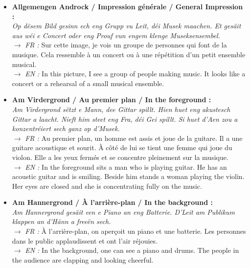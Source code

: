 \begin{itemize}
    \item \textbf{Allgemengen Androck / Impression générale / General Impression :} \\
    \textit{Op dësem Bild gesinn ech eng Grupp vu Leit, déi Musek maachen. Et gesäit aus wéi e Concert oder eng Prouf vun engem klenge Museksensembel.} \\
    $\rightarrow$ \textit{FR :} Sur cette image, je vois un groupe de personnes qui font de la musique. Cela ressemble à un concert ou à une répétition d'un petit ensemble musical. \\
    $\rightarrow$ \textit{EN :} In this picture, I see a group of people making music. It looks like a concert or a rehearsal of a small musical ensemble.

    \vspace{0.3em}

    \item \textbf{Am Virdergrond / Au premier plan / In the foreground :} \\
    \textit{Am Virdergrond sëtzt e Mann, dee Gittar spillt. Hien huet eng akustesch Gittar a laacht. Nieft him steet eng Fra, déi Gei spillt. Si huet d'Aen zou a konzentréiert sech ganz op d'Musek.} \\
    $\rightarrow$ \textit{FR :} Au premier plan, un homme est assis et joue de la guitare. Il a une guitare acoustique et sourit. À côté de lui se tient une femme qui joue du violon. Elle a les yeux fermés et se concentre pleinement sur la musique. \\
    $\rightarrow$ \textit{EN :} In the foreground sits a man who is playing guitar. He has an acoustic guitar and is smiling. Beside him stands a woman playing the violin. Her eyes are closed and she is concentrating fully on the music.

    \vspace{0.3em}

    \item \textbf{Am Hannergrond / À l'arrière-plan / In the background :} \\
    \textit{Am Hannergrond gesäit een e Piano an eng Batterie. D'Leit am Publikum klappen an d'Hänn a freeën sech.} \\
    $\rightarrow$ \textit{FR :} À l'arrière-plan, on aperçoit un piano et une batterie. Les personnes dans le public applaudissent et ont l'air réjouies. \\
    $\rightarrow$ \textit{EN :} In the background, one can see a piano and drums. The people in the audience are clapping and looking cheerful.


\end{itemize}
